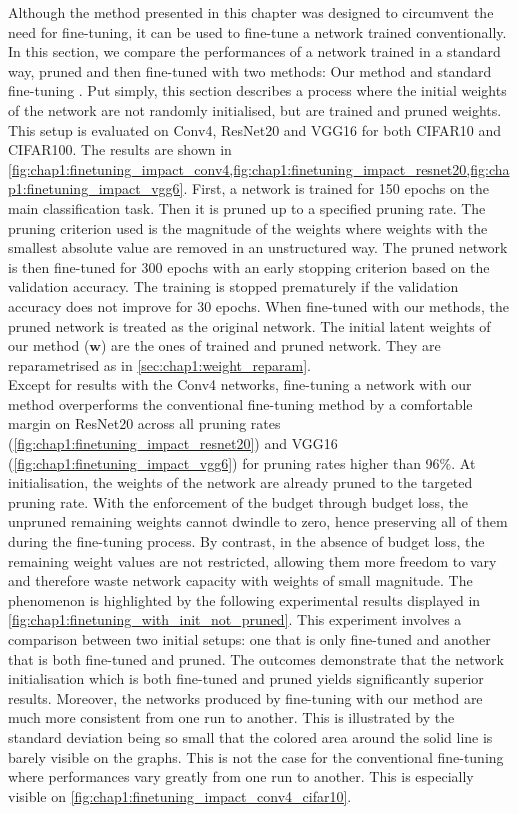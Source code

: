 Although the method presented in this chapter was designed to circumvent the
need for fine-tuning, it can be used to fine-tune a network trained
conventionally. In this section, we compare the performances of a network
trained in a standard way, pruned and then fine-tuned with two methods: Our
method and standard fine-tuning \cite{DBLP:conf/nips/HanPTD15}. Put simply, this
section describes a process where the initial weights of the network are not
randomly initialised, but are trained and pruned weights. This setup is
evaluated on Conv4, ResNet20 and VGG16 for both CIFAR10 and CIFAR100. The
results are shown in
\cref{fig:chap1:finetuning_impact_conv4,fig:chap1:finetuning_impact_resnet20,fig:chap1:finetuning_impact_vgg6}.
First, a network is trained for 150 epochs on the main classification task. Then
it is pruned up to a specified pruning rate. The pruning criterion used is the
magnitude of the weights where weights with the smallest absolute value are
removed in an unstructured way. The pruned network is then fine-tuned for 300
epochs with an early stopping criterion based on the validation accuracy. The
training is stopped prematurely if the validation accuracy does not improve for
30 epochs. When fine-tuned with our methods, the pruned network is treated as
the original network. The initial latent weights of our method ($\mathbf{w}$)
are the ones of trained and pruned network. They are reparametrised as in
\ref{sec:chap1:weight_reparam}.\\

Except for results with the Conv4 networks, fine-tuning a network with our
method overperforms the conventional fine-tuning method by a comfortable margin
on ResNet20 across all pruning rates
(\cref{fig:chap1:finetuning_impact_resnet20}) and VGG16
(\cref{fig:chap1:finetuning_impact_vgg6}) for pruning rates higher than 96\%. At
initialisation, the weights of the network are already pruned to the targeted
pruning rate. With the enforcement of the budget through budget loss, the
unpruned remaining weights cannot dwindle to zero, hence preserving all of them
during the fine-tuning process. By contrast, in the absence of budget loss, the
remaining weight values are not restricted, allowing them more freedom to vary
and therefore waste network capacity with weights of small magnitude. The
phenomenon is highlighted by the following experimental results displayed in
\cref{fig:chap1:finetuning_with_init_not_pruned}. This experiment involves a
comparison between two initial setups: one that is only fine-tuned and another
that is both fine-tuned and pruned. The outcomes demonstrate that the network
initialisation which is both fine-tuned and pruned yields significantly superior
results. Moreover, the networks produced by fine-tuning with our method are much
more consistent from one run to another. This is illustrated by the standard
deviation being so small that the colored area around the solid line is barely
visible on the graphs. This is not the case for the conventional fine-tuning
where performances vary greatly from one run to another. This is especially
visible on \cref{fig:chap1:finetuning_impact_conv4_cifar10}.\\

